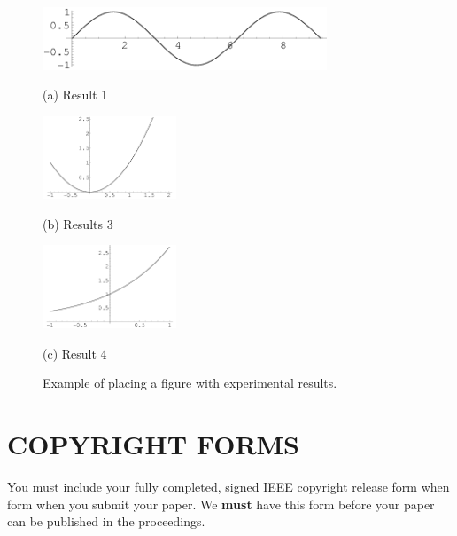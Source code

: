 \documentclass{article}
\begin{document}
\begin{figure}[htb]

\begin{minipage}[b]{1.0\linewidth}
  \centering
  \centerline{\includegraphics[width=8.5cm]{image1.png}}
  \centerline{(a) Result 1}\medskip
\end{minipage}
%
\begin{minipage}[b]{.48\linewidth}
  \centering
  \centerline{\includegraphics[width=4.0cm]{image3.png}}
  \centerline{(b) Results 3}\medskip
\end{minipage}
\hfill
\begin{minipage}[b]{0.48\linewidth}
  \centering
  \centerline{\includegraphics[width=4.0cm]{image4.png}}
  \centerline{(c) Result 4}\medskip
\end{minipage}
%
\caption{Example of placing a figure with experimental results.}
\label{fig:res}
%
\end{figure}



\section{COPYRIGHT FORMS}
\label{sec:copyright}

You must include your fully completed, signed IEEE copyright release form when
form when you submit your paper. We {\bf must} have this form before your paper
can be published in the proceedings.



\end{document}
